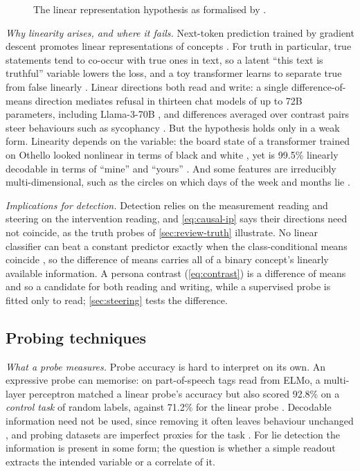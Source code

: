 \begin{figure}[t]
\centering

\caption{The linear representation hypothesis as formalised by \textcite{park2024linear}.}
\label{fig:lrh}
\end{figure}

\emph{Why linearity arises, and where it fails.} Next-token prediction trained by gradient descent
promotes linear representations of concepts \cite{jiang2024origins}. For truth in particular, true
statements tend to co-occur with true ones in text, so a latent ``this text is truthful'' variable
lowers the loss, and a toy transformer learns to separate true from false linearly
\cite{ravfogel2025emergence}. Linear directions both read and write: a single difference-of-means
direction mediates refusal in thirteen chat models of up to 72B parameters, including Llama-3-70B
\cite{arditi2024refusal}, and differences averaged over contrast pairs steer behaviours such as
sycophancy \cite{rimsky2024steering}. But the hypothesis holds only in a weak form. Linearity depends
on the variable: the board state of a transformer trained on Othello looked nonlinear in terms of black
and white \cite{li2023emergent}, yet is 99.5\% linearly decodable in terms of ``mine'' and ``yours''
\cite{nanda2023emergent}. And some features are irreducibly multi-dimensional, such as the circles on
which days of the week and months lie \cite{engels2025not}.

\emph{Implications for detection.} Detection relies on the measurement reading and steering on the
intervention reading, and \cref{eq:causal-ip} says their directions need not coincide,
as the truth probes of \cref{sec:review-truth} illustrate. No linear classifier can beat a constant predictor
exactly when the class-conditional means coincide \cite{belrose2023leace}, so the difference of means
carries all of a binary concept's linearly available information. A persona contrast
(\cref{eq:contrast}) is a difference of means and so a candidate for both reading and writing, while a
supervised probe is fitted only to read; \cref{sec:steering} tests the difference.

\subsection{Probing techniques}
\label{sec:review-probes}

\emph{What a probe measures.} Probe accuracy is hard to interpret on its own. An expressive probe can
memorise: on part-of-speech tags read from ELMo, a multi-layer perceptron matched a linear probe's
accuracy but also scored 92.8\% on a \emph{control task} of random labels, against 71.2\% for the
linear probe \cite{hewitt2019designing}. Decodable information need not be used, since removing it often
leaves behaviour unchanged \cite{elazar2021amnesic}, and probing datasets are imperfect proxies for
the task \cite{belinkov2022probing}. For lie detection the information is present in some form; the
question is whether a simple readout extracts the intended variable or a correlate of it.

